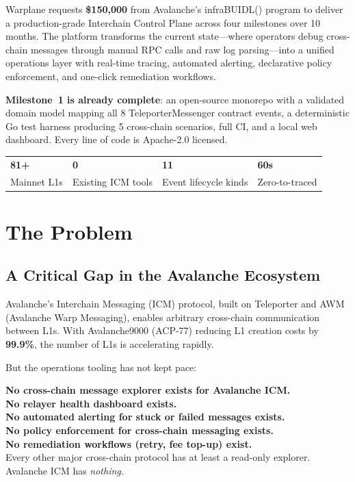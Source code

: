 \documentclass[11pt,a4paper]{article}
\begin{document}
\medskip

Warplane requests \textbf{\$150,000} from Avalanche's infraBUIDL() program to deliver a production-grade Interchain Control Plane across four milestones over 10 months. The platform transforms the current state---where operators debug cross-chain messages through manual RPC calls and raw log parsing---into a unified operations layer with real-time tracing, automated alerting, declarative policy enforcement, and one-click remediation workflows.

\textbf{Milestone~1 is already complete}: an open-source monorepo with a validated domain model mapping all 8 TeleporterMessenger contract events, a deterministic Go test harness producing 5 cross-chain scenarios, full CI, and a local web dashboard. Every line of code is Apache-2.0 licensed.

\begin{metricbox}
\begin{tabularx}{\textwidth}{@{}X X X X@{}}
\textbf{81+} & \textbf{0} & \textbf{11} & \textbf{60s} \\
Mainnet L1s & Existing ICM tools & Event lifecycle kinds & Zero-to-traced \\
\end{tabularx}
\end{metricbox}

\section{The Problem}

\subsection{A Critical Gap in the Avalanche Ecosystem}

Avalanche's Interchain Messaging (ICM) protocol, built on Teleporter and AWM (Avalanche Warp Messaging), enables arbitrary cross-chain communication between L1s. With Avalanche9000 (ACP-77) reducing L1 creation costs by \textbf{99.9\%}, the number of L1s is accelerating rapidly.

But the operations tooling has not kept pace:

\begin{gapbox}
\textbf{No cross-chain message explorer exists for Avalanche ICM.}\\
\textbf{No relayer health dashboard exists.}\\
\textbf{No automated alerting for stuck or failed messages exists.}\\
\textbf{No policy enforcement for cross-chain messaging exists.}\\
\textbf{No remediation workflows (retry, fee top-up) exist.}\\[4pt]
Every other major cross-chain protocol has at least a read-only explorer. Avalanche ICM has \emph{nothing}.
\end{gapbox}
\end{document}

